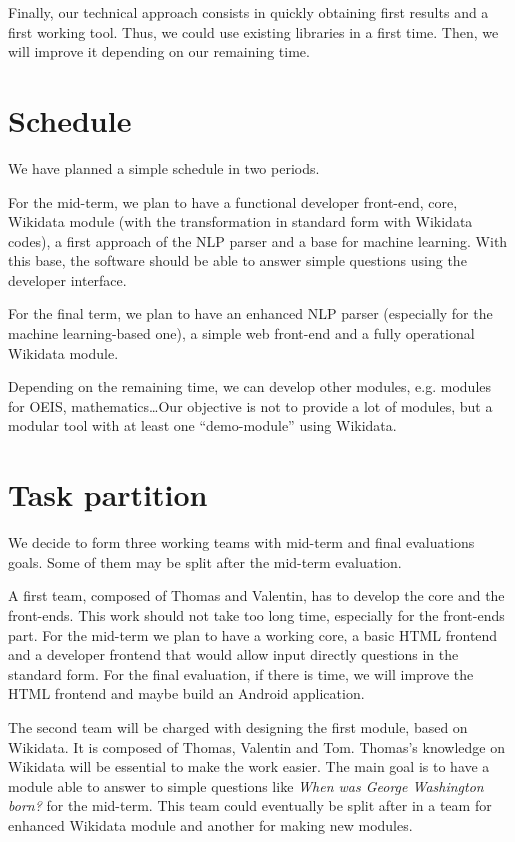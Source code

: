 \documentclass[a4paper,10pt]{article}
\begin{document}
Finally, our technical approach consists in quickly obtaining first results and 
a first working tool. Thus, we could use existing libraries in a first time. Then, 
we will improve it depending on our remaining time.

\section{Schedule}

We have planned a simple schedule in two periods.

For the mid-term, we plan to have a functional developer front-end, core, 
Wikidata module (with the transformation in standard form with Wikidata codes), 
a first approach of the NLP parser and a base for machine learning. With this 
base, the software should be able to answer simple questions using the developer 
interface.

For the final term, we plan to have an enhanced NLP parser (especially for the 
machine learning-based one), a simple web front-end and a fully operational 
Wikidata module.

Depending on the remaining time, we can develop other modules, e.g. modules for 
OEIS, mathematics\ldots Our objective is not to provide a lot of modules, but a 
modular tool with at least one ``demo-module'' using Wikidata.

\section{Task partition}

We decide to form three working teams with mid-term and final evaluations goals. Some of them
may be split after the mid-term evaluation.

A first team, composed of Thomas and Valentin, has to develop the core and the front-ends.
This work should not take too long time, especially for the front-ends part. For the mid-term
we plan to have a working core, a basic HTML frontend and a developer frontend that would
allow input directly questions in the standard form. For the final evaluation, if there is time,
we will improve the HTML frontend and maybe build an Android application.

The second team will be charged with designing the first module, based on Wikidata. It is
composed of Thomas, Valentin and Tom. Thomas's knowledge on Wikidata will be essential
to make the work easier. The main goal is to have a module able to answer to simple questions
like \textit{When was George Washington born?} for the mid-term. This team could eventually be
split after in a team for enhanced Wikidata module and another for making new modules.
\end{document}
